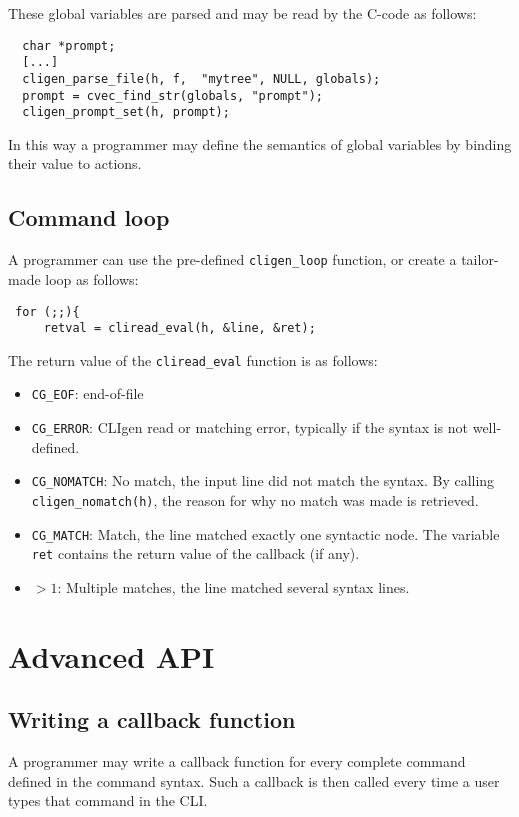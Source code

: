 \documentclass[a4paper, 10pt] {article}
\begin{document}
These global variables are parsed and may be read by the C-code as follows:
\begin{verbatim}
  char *prompt;
  [...]
  cligen_parse_file(h, f,  "mytree", NULL, globals);
  prompt = cvec_find_str(globals, "prompt");
  cligen_prompt_set(h, prompt);
\end{verbatim}

In this way a programmer may define the semantics of global variables
by binding their value to actions.

\subsection{Command loop}
\label{sec:main}

A programmer can use the pre-defined {\tt cligen\_loop} function, or create a tailor-made loop as follows:

\begin{verbatim}
 for (;;){
     retval = cliread_eval(h, &line, &ret);
\end{verbatim}
The return value of the {\tt cliread\_eval} function is as follows:
\begin{itemize}
\item {\tt CG\_EOF}: end-of-file
\item {\tt CG\_ERROR}: CLIgen read or matching error, typically if the syntax is not well-defined.
\item {\tt CG\_NOMATCH}: No match, the input line did not match the syntax. By calling {\tt cligen\_nomatch(h)}, the reason for why no match was made is retrieved.
\item {\tt CG\_MATCH}: Match, the line matched exactly one syntactic node. The variable {\tt ret} contains the return value of the callback (if any).
\item $> 1$: Multiple matches, the line matched several syntax lines.
\end{itemize}


\section{Advanced API}

\subsection{Writing a callback function}

A programmer may write a callback function for every complete command
defined in the command syntax. Such a callback is then called every
time a user types that command in the CLI.
\end{document}
